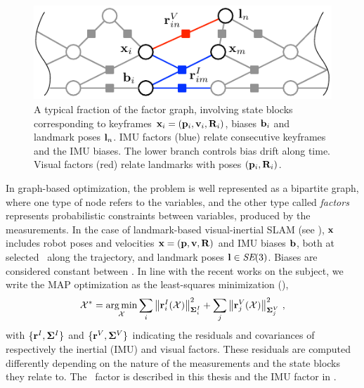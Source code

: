 \begin{figure}
    \centering
    \includegraphics[scale=1.3]{figures/absolute/graph}
    \caption{A typical fraction of the factor graph, involving state blocks corresponding to keyframes ${\bf x}_i=({\bf p}_i,{\bf v}_i,{\bf R}_i)$, biases ${\bf b}_i$ and landmark poses ${\bf l}_n$. 
    IMU factors (blue) relate consecutive keyframes and the IMU biases.
    The lower branch controls bias drift along time.
    Visual factors (red) relate landmarks with poses $({\bf p}_i,{\bf R}_i)$.}
    \label{fig:VI_factor_graph}
\end{figure}

In graph-based optimization, the problem is well represented as a bipartite graph, where one type of node refers to the variables, 
and the other type called \emph{factors} represents probabilistic constraints between variables, produced by the measurements.
%
In the case of landmark-based visual-inertial SLAM (see ), ${\bf x}$ includes robot poses and velocities 
${\bf x}=({\bf p},{\bf v},{\bf R})$ and IMU biases ${\bf b}$, both at selected \keyframes\ along the trajectory, and landmark poses ${\bf l} \in \textit{SE}(3)$.
Biases are considered constant between \keyframes.
%
In line with the recent works on the subject, we write the MAP optimization as the least-squares minimization (),
%
\begin{align}\label{equ:least_squares}
    \mathcal{X}^* = \operatorname*{arg\,min}_{\mathcal{X}} 
    \sum_i {\left\|{\bf r}^I_i(\mathcal{X})\right\|}_{{\bm \Sigma}^I_i}^2
    +
    \sum_j {\left\|{\bf r}^V_j(\mathcal{X})\right\|}_{{\bm \Sigma}^V_j}^2
~,
\end{align}
%
with $\{{\bf r}^I,{\bm \Sigma}^I\}$ and $\{{\bf r}^V,{\bm \Sigma}^V\}$ indicating the residuals and covariances of respectively the inertial (IMU) and visual factors.
These residuals are computed differently depending on the nature of the measurements and the state blocks they relate to. 
The \apriltag\ factor is described in this thesis  and the IMU factor in .


